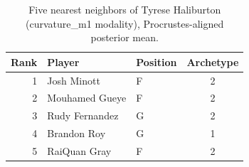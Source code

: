 \begin{table}[htbp]
  \centering\small
  \begin{tabular}{rllc}
    \toprule
    Rank & Player & Position & Archetype \\
    \midrule
    1 & Josh Minott & F & 2 \\
    2 & Mouhamed Gueye & F & 2 \\
    3 & Rudy Fernandez & G & 2 \\
    4 & Brandon Roy & G & 1 \\
    5 & RaiQuan Gray & F & 2 \\
    \bottomrule
  \end{tabular}
  \caption{Five nearest neighbors of Tyrese Haliburton (curvature_m1 modality), Procrustes-aligned posterior mean.}
  \label{tab:Tyrese_Haliburton_neighbors_curvature_m1}
\end{table}

